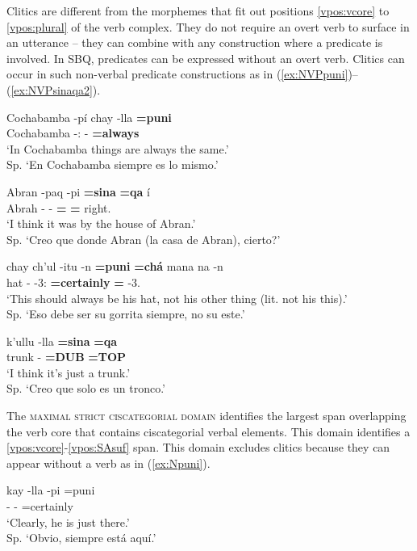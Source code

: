 \documentclass[output=paper]{langscibook}
\begin{document}
Clitics are different from the morphemes that fit out positions \ref{vpos:vcore} to \ref{vpos:plural} of the verb complex. They do not require an overt verb to surface in an utterance – they can combine with any construction where a predicate is involved. In SBQ, predicates can be expressed without an overt verb. Clitics can occur in such non-verbal predicate constructions as in (\ref{ex:NVPpuni})–(\ref{ex:NVPsinaqa2}). 

\ea \label{ex:NVPpuni}
    \gll Cochabamba -pí chay -lla \textbf{=puni} \\
    Cochabamba -\Loc{}:\Top{} \Dem{} -\Limit{} \textbf{=always} \\
    \glt `In Cochabamba things are always the same.' \\ Sp. `En Cochabamba siempre es lo mismo.'
\z

\ea \label{ex:NVPsinaqa1}
    \gll Abran -paq -pi \textbf{=sina} \textbf{=qa} í \\
    Abrah -\Gen{} -\Loc{} \textbf{=\Dub{}} \textbf{=\Top{}} right.\Inter{} \\
    \glt `I think it was by the house of Abran.' \\ Sp. `Creo que donde Abran (la casa de Abran), cierto?'  
\z 

\ea \label{ex:NVPpunicha}
    \gll chay ch'ul -itu -n \textbf{=puni} \textbf{=chá} mana na -n \\
    \Dem{} hat -\Dim{} -3\Sg{}:\Poss{} \textbf{=certainly} \textbf{=\Dub{}} \Neg{} \Dem{} -3\Sg{}.\Poss{} \\
    \glt `This should always be his hat, not his other thing (lit. not his this).' \\ Sp. `Eso debe ser su gorrita siempre, no su este.'
\z 

\ea \label{ex:NVPsinaqa2}
    \gll k'ullu -lla \textbf{=sina} \textbf{=qa} \\
    trunk -\Limit{} \textbf{=DUB} \textbf{=TOP} \\ 
    \glt `I think it's just a trunk.' \\ Sp. `Creo que solo es un tronco.' \\ 
\z 

The \textsc{maximal strict ciscategorial domain} identifies the largest span overlapping the verb core that contains ciscategorial verbal elements. This domain identifies a \ref{vpos:vcore}-\ref{vpos:SAsuf} span. This domain excludes clitics because they can appear without a verb as in (\ref{ex:Npuni}).

\ea \label{ex:Npuni}
    \gll kay -lla -pi =puni \\
    \Dem{} -\Limit{} -\Loc{} =certainly \\
    \glt `Clearly, he is just there.' \\ Sp. `Obvio, siempre está aquí.'
\z 
\end{document}
